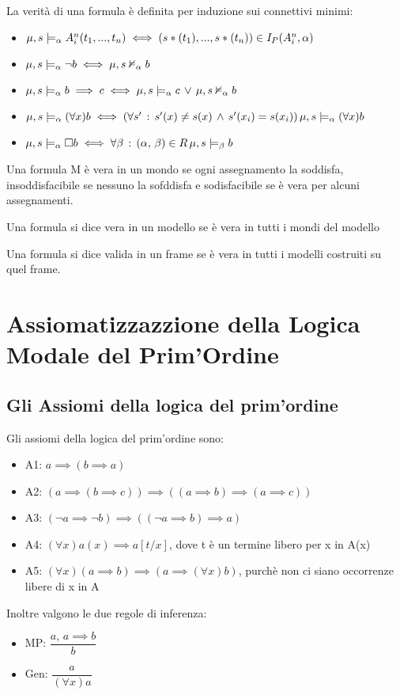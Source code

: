 La verità di una formula è definita per induzione sui connettivi minimi:
\begin{itemize}
\item $\mu,s\models_{\alpha}A_{i}^{n}(t_{1},...,t_{n})\iff(s*(t_{1}),...,s*(t_{n}))\in I_{P}(A_{i}^{n},\alpha)$
\item $\mu,s\models_{\alpha}\neg b\iff\mu,s\nvDash_{\alpha}b$
\item $\mu,s\models_{\alpha}b\implies c\iff\mu,s\models_{\alpha}c\,\vee\,\mu,s\nvDash_{\alpha}b$
\item $\mu,s\models_{\alpha}(\forall x)b\iff(\forall s'\,:\, s'(x)\not=s(x)\,\wedge\, s'(x_{i})=s(x_{i}))\,\mu,s\models_{\alpha}(\forall x)b$
\item $\mu,s\models_{\alpha}\square b\iff\forall\beta\,:\,(\alpha,\,\beta)\in R\,\mu,s\models_{\beta}b$
\end{itemize}
Una formula M è vera in un mondo se ogni assegnamento la soddisfa,
insoddisfacibile se nessuno la sofddisfa e sodisfacibile se è vera
per alcuni assegnamenti.

Una formula si dice vera in un modello se è vera in tutti i mondi
del modello

Una formula si dice valida in un frame se è vera in tutti i modelli
costruiti su quel frame.


\section{Assiomatizzazzione della Logica Modale del Prim'Ordine}


\subsection{Gli Assiomi della logica del prim'ordine}

Gli assiomi della logica del prim'ordine sono:
\begin{itemize}
\item A1: $a\implies(b\implies a)$
\item A2: $(a\implies(b\implies c))\implies((a\implies b)\implies(a\implies c))$
\item A3: $(\neg a\implies\neg b)\implies((\neg a\implies b)\implies a)$
\item A4: $(\forall x)a(x)\implies a[t/x]$, dove t è un termine libero
per x in A(x)
\item A5: $(\forall x)(a\implies b)\implies(a\implies(\forall x)b)$, purchè
non ci siano occorrenze libere di x in A
\end{itemize}
Inoltre valgono le due regole di inferenza:
\begin{itemize}
\item MP: $\dfrac{a,\, a\implies b}{b}$
\item Gen: $\dfrac{a}{(\forall x)a}$
\end{itemize}

